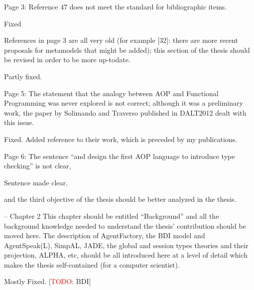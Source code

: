 \documentclass{article}
\newcommand{\todo}[1]{[\textcolor{red}{TODO}: #1]}
\newenvironment{them}{\noindent\begingroup\color{blue}}{\endgroup\par}
\begin{document}
\begin{them}

Page 3:
Reference 47 does not meet the standard for bibliographic items.

\end{them}
Fixed

\begin{them}

References in page 3 are all very old (for example [32]: there are more recent
proposals for metamodels that might be added); this section of the thesis
should be revised in order to be more up-todate.

\end{them}
Partly fixed.

\begin{them}

Page 5:
The statement that the analogy between AOP and Functional Programming was never
explored is not correct; although it was a preliminary work, the paper by
Solimando and Traverso published in DALT2012 dealt with this issue.

\end{them}
Fixed. Added reference to their work, which is preceded by my publications.

\begin{them}

Page 6:
The sentence “and design the first AOP language to introduce type checking” is
not clear,

\end{them}
Sentence made clear. 

\begin{them}

and the third objective of the thesis should be better analyzed in
the thesis.

\end{them}
\todo{} 

\begin{them}

-- Chapter 2
This chapter should be entitled “Background” and all the background knowledge
needed to understand the thesis' contribution should be moved here. The
description of AgentFactory, the BDI model and AgentSpeak(L), SimpAL, JADE, the
global and session types theories and their projection, ALPHA, etc, should be
all introduced here at a level of detail which makes the thesis self-contained
(for a computer scientist).

\end{them}
Mostly Fixed.
\todo{BDI}
\end{document}
